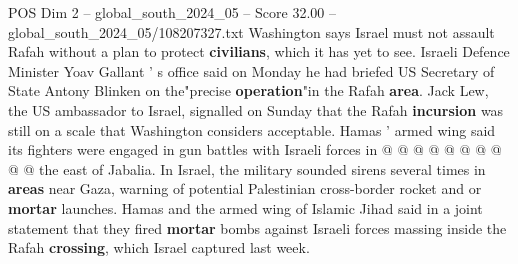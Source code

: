 \begin{textsample}{POS Dim 2 – global\_south\_2024\_05 – Score 32.00 – global\_south\_2024\_05/108207327.txt}
Washington says Israel must not assault Rafah without a plan to protect \textbf{civilians}, which it has yet to see.
Israeli Defence Minister Yoav Gallant ' s office said on Monday he had briefed US Secretary of State Antony Blinken on the"precise \textbf{operation}"in the Rafah \textbf{area}.
Jack Lew, the US ambassador to Israel, signalled on Sunday that the Rafah \textbf{incursion} was still on a scale that Washington considers acceptable.
Hamas ' armed wing said its fighters were engaged in gun battles with Israeli forces in @ @ @ @ @ @ @ @ @ @ the east of Jabalia.
In Israel, the military sounded sirens several times in \textbf{areas} near Gaza, warning of potential Palestinian cross-border rocket and or \textbf{mortar} launches.
Hamas and the armed wing of Islamic Jihad said in a joint statement that they fired \textbf{mortar} bombs against Israeli forces massing inside the Rafah \textbf{crossing}, which Israel captured last week.

\end{textsample}
